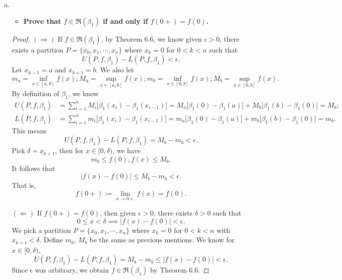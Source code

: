 \begin{Exercise}
	\begin{enumerate}[(a)]
		\item 
		\begin{itemize}
			\item \textbf{Prove that $f\in \mathfrak{R}(\beta_1)$ if and only if $f(0+) = f(0)$.}
		\end{itemize}
		\begin{proof}
			$(\Longrightarrow)$
			If $f\in \mathfrak{R}(\beta_1)$, by Theorem 6.6, we know given $\epsilon>0$, there exists a partition $P = \{x_0, x_1, \cdots, x_n\}$ where $x_k = 0$ for $0 < k < n$ such that 
			$$
			U(P,f,\beta_1) - L(P,f,\beta_1) < \epsilon.
			$$
			Let $x_{k-1} = a$ and $x_{k+1} = b$.
			We also let
			$$
			m_a = \inf_{x\in[a, 0]} f(x);
			M_a = \sup_{x\in[a, 0]} f(x);
			m_b = \inf_{x\in[0, b]} f(x);
			M_b = \sup_{x\in[0, b]} f(x).
			$$
			By definition of $\beta_1$, we know
			\begin{align*}
			U(P,f,\beta_1)
			&= \sum_{i=1}^{n}M_i \big[ \beta_1(x_i) - \beta_1(x_{i-1}) \big]
			= M_a \big[ \beta_1(0) - \beta_1(a) \big] + M_b \big[ \beta_1(b) - \beta_1(0) \big]
			= M_b; \\
			L(P,f,\beta_1)
			&= \sum_{i=1}^{n}m_i \big[ \beta_1(x_i) - \beta_1(x_{i-1}) \big]
			= m_a \big[ \beta_1(0) - \beta_1(a) \big] + m_b \big[ \beta_1(b) - \beta_1(0) \big]
			= m_b.
			\end{align*}
			This means
			$$
			U(P,f,\beta_1) - L(P,f,\beta_1) 
			= M_b - m_b
			< \epsilon.
			$$
			Pick $\delta = x_{k+1}$, then for $x\in[0, \delta)$, we have
			$$
			m_b \leq f(0), f(x) \leq M_b.
			$$
			It follows that
			$$
			|f(x) - f(0)| \leq M_b - m_b < \epsilon.
			$$
			That is, 
			$$
			f(0+) := \lim_{x\to 0+} f(x) = f(0).
			$$
			
			\vspace{2ex}
			
			$(\Longleftarrow)$
			If $f(0+) = f(0)$, then given $\epsilon > 0$, there exists $\delta > 0$ such that
			$$
			0 \leq x < \delta \implies |f(x) - f(0)| < \epsilon.
			$$
			We pick a partition $P = \{x_0, x_1, \cdots, x_n\}$ where $x_k = 0$ for $0 < k < n$ with $x_{k+1} < \delta$. 
			Define $m_b$, $M_b$ be the same as previous mentions.
			We know for $x\in [0, \delta)$,
			$$
			U(P,f,\beta_1) - L(P,f,\beta_1)
			= M_b - m_b
			\leq |f(x) - f(0)|
			< \epsilon.
			$$
			Since $\epsilon$ was arbitrary, we obtain $f\in\mathfrak{R}(\beta_1)$ by Theorem 6.6.
		\end{proof}
		

\end{enumerate}
\end{Exercise}
